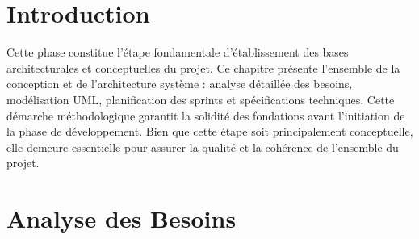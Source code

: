 \documentclass[12pt,a4paper]{report}
\begin{document}
\section{Introduction}
Cette phase constitue l'étape fondamentale d'établissement des bases architecturales et conceptuelles du projet. Ce chapitre présente l'ensemble de la conception et de l'architecture système : analyse détaillée des besoins, modélisation UML, planification des sprints et spécifications techniques. Cette démarche méthodologique garantit la solidité des fondations avant l'initiation de la phase de développement. Bien que cette étape soit principalement conceptuelle, elle demeure essentielle pour assurer la qualité et la cohérence de l'ensemble du projet.

\section{Analyse des Besoins}
\end{document}
